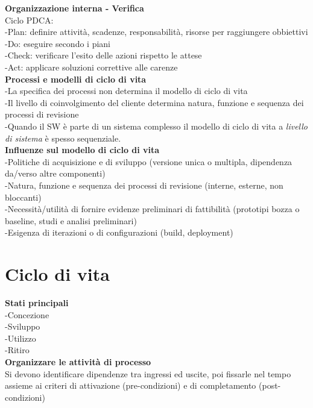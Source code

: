 \documentclass{article}
\begin{document}
		\textbf{Organizzazione interna - Verifica}\\
		Ciclo PDCA:\\
		-Plan: definire attività, scadenze, responsabilità, risorse per raggiungere obbiettivi\\
		-Do: eseguire secondo i piani\\
		-Check: verificare l'esito delle azioni rispetto le attese\\
		-Act: applicare soluzioni correttive alle carenze\\
		
		\textbf{Processi e modelli di ciclo di vita}\\
		-La specifica dei processi non determina il modello di ciclo di vita\\
		-Il livello di coinvolgimento del cliente determina natura, funzione e sequenza dei processi di revisione\\
		-Quando il SW è parte di un sistema complesso il modello di ciclo di vita a \textit{livello di sistema} è spesso sequenziale.\\
		
		\textbf{Influenze sul modello di ciclo di vita}\\
		-Politiche di acquisizione e di sviluppo (versione unica o multipla, dipendenza da/verso altre componenti)\\
		-Natura, funzione e sequenza dei processi di revisione (interne, esterne, non bloccanti)\\
		-Necessità/utilità di fornire evidenze preliminari di fattibilità (prototipi bozza o baseline, studi e analisi preliminari)\\
		-Esigenza di iterazioni o di configurazioni (build, deployment)\\
			
			
			
			
	\clearpage
	\section{Ciclo di vita}
	
		\textbf{Stati principali}\\
		-Concezione\\
		-Sviluppo\\
		-Utilizzo\\
		-Ritiro\\
		
		\textbf{Organizzare le attività di processo}\\
		Si devono identificare dipendenze tra ingressi ed uscite, poi fissarle nel tempo assieme ai criteri di attivazione (pre-condizioni) e di completamento (post-condizioni)\\
		
\end{document}
